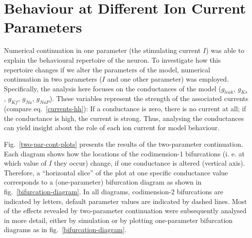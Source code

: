 \documentclass[12pt,a4paper,]{report}
\begin{document}
\section{Behaviour at Different Ion Current
Parameters}\label{two-par-cont}

Numerical continuation in one parameter (the stimulating current $I$)
was able to explain the behavioural repertoire of the neuron. To
investigate how this repertoire changes if we alter the parameters of
the model, numerical continuation in two parameters ($I$ and one other
parameter) was employed. Specifically, the analysis here focuses on the
conductances of the model ($g_{leak}$, $g_{Ks}$, $g_{Kf}$, $g_{Na}$,
$g_{NaP}$). These variables represent the strength of the associated
currents (compare eq.~\ref{currents-hh}): If a conductance is zero,
there is no current at all; if the conductance is high, the current is
strong. Thus, analysing the conductances can yield insight about the
role of each ion current for model behaviour.

Fig.~\ref{two-par-cont-plots} presents the results of the two-parameter
continuation. Each diagram shows how the locations of the codimension-1
bifurcations (i. e. at which value of $I$ they occur) change, if one
conductance is altered (vertical axis). Therefore, a ``horizontal
slice'' of the plot at one specific conductance value corresponds to a
(one-parameter) bifurcation diagram as shown in
fig.~\ref{bifurcation-diagram}. In all diagrams, codimension-2
bifurcations are indicated by letters, default parameter values are
indicated by dashed lines. Most of the effects revealed by two-parameter
continuation were subsequently analysed in more detail, either by
simulation or by plotting one-parameter bifurcation diagrams as in
fig.~\ref{bifurcation-diagram}.
\end{document}
